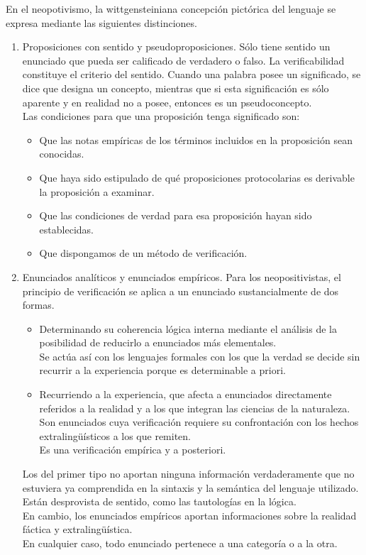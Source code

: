 \documentclass[a4paper, 11pt, twocolumn, spanish]{article}
\begin{document}
En el neopotivismo, la wittgensteiniana concepción pictórica del
lenguaje se expresa mediante las siguientes distinciones.
\begin{enumerate}
\item Proposiciones con sentido y pseudoproposiciones. Sólo tiene
sentido un enunciado que pueda ser calificado de verdadero o
falso. La verificabilidad constituye el criterio del
sentido. Cuando una palabra posee un significado, se dice que
designa un concepto, mientras que si esta significación es sólo
aparente y en realidad no a posee, entonces es un
pseudoconcepto.\\
Las condiciones para que una proposición tenga significado son:
\begin{itemize}
\item Que las notas empíricas de los términos incluidos en la
proposición sean conocidas.
\item Que haya sido estipulado de qué proposiciones protocolarias es
derivable la proposición a examinar.
\item Que las condiciones de verdad para esa proposición hayan sido
establecidas.
\item Que dispongamos de un método de verificación.
\end{itemize}

\item Enunciados analíticos y enunciados empíricos. Para los
neopositivistas, el principio de verificación se aplica a un
enunciado sustancialmente de dos formas.
\begin{itemize}
\item Determinando su coherencia lógica interna mediante el análisis
de la posibilidad de reducirlo a enunciados más elementales.\\
Se actúa así con los lenguajes formales con los que la verdad
se decide sin recurrir a la experiencia porque es determinable
a priori.\\

\item Recurriendo a la experiencia, que afecta a enunciados
directamente referidos a la realidad y a los que integran las
ciencias de la naturaleza.\\
Son enunciados cuya verificación requiere su confrontación con
los hechos extralingüísticos a los que remiten.\\
Es una verificación empírica y a posteriori.
\end{itemize}

Los del primer tipo no aportan ninguna información verdaderamente
que no estuviera ya comprendida en la sintaxis y la semántica del
lenguaje utilizado. Están desprovista de sentido, como las
tautologías en la lógica.\\
En cambio, los enunciados empíricos aportan informaciones sobre la
realidad fáctica y extralingüística.\\
En cualquier caso, todo enunciado pertenece a una categoría o a la
otra.\\


\end{enumerate}
\end{document}
